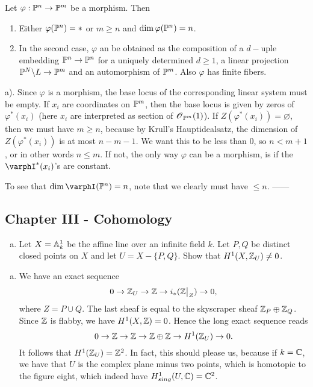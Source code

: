 \documentclass[11pt, english]{article}
\begin{document}
\begin{exc}[Exercise 7.3]
Let $\varphi: \mathbb{P}^n \to \mathbb{P}^m$ be a morphism. Then
\begin{enumerate}
  \item Either $\varphi(\mathbb{P}^n)=\ast$ or $m \geq n$ and $\dim \varphi(\mathbb{P}^n)=n$.
  \item In the second case, $\varphi$ an be obtained as the composition of a $d-$uple embedding $\mathbb{P}^n \to \mathbb{P}^n$ for a uniquely determined $d \geq 1$, a linear projection $\mathbb{P}^N \backslash L \to \mathbb{P}^m$ and an automorphism of $\mathbb{P}^m$. Also $\varphi$ has finite fibers.
\end{enumerate}
\end{exc}
\begin{sol}
  a). Since $\varphi$ is a morphism, the base locus of the corresponding linear system must be empty. If $x_i$ are coordinates on $\mathbb{P}^m$, then the base locus is given by zeros of $\varphi^\ast(x_i)$ (here $x_i$ are interpreted as section of $\operatorname{\mathscr{O}}_{\mathbb{P}^m}(1)$). If $Z(\varphi^\ast(x_i))= \varnothing$, then we must have $m \geq n$, because by Krull's Hauptidealsatz, the dimension of $Z(\varphi^\ast(x_i))$ is at most $n-m-1$. We want this to be less than $0$, so $n < m+1$, or in other words $n\le m$. If not, the only way $\varphi$ can be a morphism, is if the $\varphI^\ast(x_i)$'s are constant.

  To see that $\dim \varphI(\PP^n)=n$, note that we clearly must have $\le n$. ------
\end{sol}


\subsection{Chapter III - Cohomology}

\begin{exc}[Exercise 2.1]
  \begin{enumerate}[a)]
  \item Let $X=\mathbb{A}_k^1$ be the affine line over an infinite field $k$. Let $P,Q$ be distinct closed points on $X$ and let $U=X - \{ P,Q\}$. Show that $H^1(X,\mathbb{Z}_U)\neq 0$.
  \end{enumerate}
\end{exc}

\begin{sol}
  \begin{enumerate}[a)]
  \item We have an exact sequence
\[
0 \to \Z_U \to \Z \to i_\ast(\restr{\Z}{Z}) \to 0,
\]
where $Z=P \cup Q$. The last sheaf is equal to the skyscraper sheaf $\mathbb{Z}_P \oplus \mathbb{Z}_Q$. Since $\mathbb{Z}$ is flabby, we have $H^1(X,\mathbb{Z})=0$. Hence the long exact sequence reads 
\[
0 \to \mathbb{Z} \to \mathbb{Z} \to \mathbb{Z} \oplus \mathbb{Z} \to H^1(\mathbb{Z}_U) \to 0.
\]
It follows that $H^1(\mathbb{Z}_U)=\mathbb{Z}^2$. In fact, this should please us, because if $k=\mathbb{C}$, we have that $U$ is the complex plane minus two points, which is homotopic to the figure eight, which indeed have $H_{sing}^1(U,\mathbb{C})=\mathbb{C}^2$.
  \end{enumerate}
\end{sol}
\end{document}
